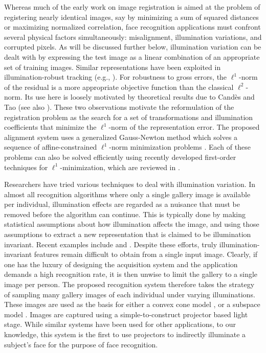 Whereas much of the early work on image registration is aimed at the problem of
registering nearly identical images, say by minimizing a sum of squared
distances or maximizing normalized correlation, face recognition applications
must confront several physical factors simultaneously: misalignment,
illumination variations, and corrupted pixels.  As will be discussed further
below, illumination variation can be dealt with by expressing the test image as
a linear combination of an appropriate set of training images. Similar
representations have been exploited in illumination-robust tracking (e.g.,
\cite{Belhumeur1999-PAA,Murase1995-IJCV}).  For robustness to gross errors, the
$\ell^1$-norm of the residual is a more appropriate objective function than the
classical $\ell^2$-norm. Its use here is loosely motivated by theoretical
results due to Cand\`{e}s and Tao \cite{CandesE2005-IT} (see also
\cite{Wright2008-IT}). These two observations motivate the reformulation of the
registration problem as the search for a set of transformations and
illumination coefficients that minimize the $\ell^1$-norm of the representation
error.  The proposed alignment system uses a generalized Gauss-Newton method
which solves a sequence of affine-constrained $\ell^1$-norm minimization
problems \cite{Osborne1990-JAMSSB,Jittorntrum1980-NM}. Each of these problems
can also be solved efficiently using recently developed first-order techniques
for $\ell^1$-minimization, which are reviewed in \cite{YangA2010-pp}.

Researchers have tried various techniques to deal with illumination variation.
In almost all recognition algorithms where only a single gallery image is
available per individual, illumination effects are regarded as a nuisance that
must be removed before the algorithm can continue.  This is typically done by
making statistical assumptions about how illumination affects the image, and
using those assumptions to extract a new representation that is claimed to be
illumination invariant.  Recent examples include \cite{chen2006total} and
\cite{zhou2007appearance}.  Despite these efforts, truly
illumination-invariant features remain difficult to obtain from a single input
image.  Clearly, if one has the luxury of designing the acquisition system
and the application demands a high recognition rate,
it is then unwise to limit the gallery to a
single image per person.  The proposed recognition system therefore takes the strategy of sampling many
gallery images of each individual under varying illuminations.  These images
are used as the basis for either a convex cone model
\cite{Georghiades2001-PAMI,belhumeur1998set}, or a subspace model
\cite{Basri2003-PAMI}.  Images are captured using a simple-to-construct
projector based light stage.  While similar systems have been used for
other applications, to our knowledge, this
system is the first to use projectors to indirectly illuminate a subject's face for
the purpose of face recognition.


